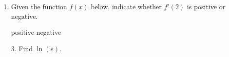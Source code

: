 \documentclass[11pt]{article}
\begin{document}
\pagestyle{empty}
\newsavebox{\quizfront}
\begin{lrbox}{\quizfront}
\begin{minipage}[top][4.5in][t]{\textwidth} \setlength{\parindent}{1.5em}
\drawtitle
\vspace{-0.5in}
\begin{enumerate}

\item Given the function $f(x)$ below, indicate whether $f'(2)$ is
  positive or negative.

  \vfill
  
  \begin{center}
    \vfill
    \textbigcircle\; positive\hspace{1.5in} \textbigcircle\; negative
  \end{center}
  \vfill

\end{enumerate}



\end{minipage}
\end{lrbox}

\newsavebox{\quizback}
\begin{lrbox}{\quizback}
\begin{minipage}[top][4.5in][t]{\textwidth} \setlength{\parindent}{1.5em}
\begin{itemize}
 \item[3.] Find $\ln(e)$. 


\end{itemize}
\end{minipage}
\end{lrbox}

\noindent \usebox{\quizfront}
\vfill
\noindent \usebox{\quizfront}

\end{document}
